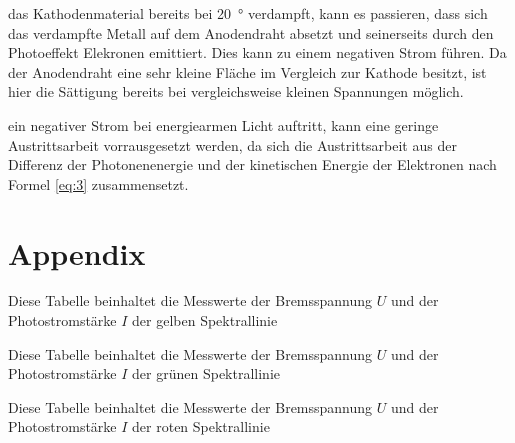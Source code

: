     \justifying das Kathodenmaterial bereits bei \SI{20}{\degree} verdampft, kann es passieren, dass sich das verdampfte Metall auf dem Anodendraht absetzt und
    seinerseits durch den Photoeffekt Elekronen emittiert. Dies kann zu einem negativen Strom führen. Da der Anodendraht eine sehr kleine Fläche im Vergleich zur Kathode besitzt, 
    ist hier die Sättigung bereits bei vergleichsweise kleinen Spannungen möglich. 

    \justifying ein negativer Strom bei energiearmen Licht auftritt, kann eine geringe Austrittsarbeit vorrausgesetzt werden, da sich die Austrittsarbeit aus der 
    Differenz der Photonenenergie und der kinetischen Energie der Elektronen nach Formel \eqref{eq:3} zusammensetzt.

\newpage
\printbibliography

\newpage
\section{Appendix}

\begin{table}[H]
    \centering
    \caption{Diese Tabelle beinhaltet die Messwerte der Bremsspannung $U$ und der Photostromstärke $I$ der gelben Spektrallinie}
    
    \label{tab:1}
\end{table}

\begin{table}[H]
    \centering
    \caption{Diese Tabelle beinhaltet die Messwerte der Bremsspannung $U$ und der Photostromstärke $I$ der grünen Spektrallinie}
    
    \label{tab:2}
\end{table}

\begin{table}[H]
    \centering
    \caption{Diese Tabelle beinhaltet die Messwerte der Bremsspannung $U$ und der Photostromstärke $I$ der roten Spektrallinie}
    
    \label{tab:3}
\end{table}




